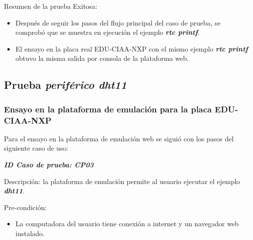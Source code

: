 Resumen de la prueba Exitosa:
\begin{itemize}
	\item Después de seguir los pasos del flujo principal del caso de prueba, se comprobó que se muestra en ejecución el ejemplo \textit{\textbf{rtc printf}}.
	\item El ensayo en la placa real EDU-CIAA-NXP  con el mismo ejemplo \textit{\textbf{rtc printf}} obtuvo la misma salida por consola de la plataforma web.

\end{itemize}


\subsection{Prueba \textit{\textbf{periférico dht11}} }

\subsubsection{Ensayo en la plataforma de emulación para la placa EDU-CIAA-NXP} 
Para el ensayo en la plataforma de emulación web se siguió con los pasos del siguiente caso de uso:

\textit{\textbf{ID Caso de prueba: CP03}}

Descripción: la plataforma de emulación permite al usuario ejecutar el ejemplo \textit{\textbf{dht11}}.

Pre-condición: 
\begin{itemize}
	\item La computadora del usuario tiene conexión a internet y un navegador web instalado.
\end{itemize}

